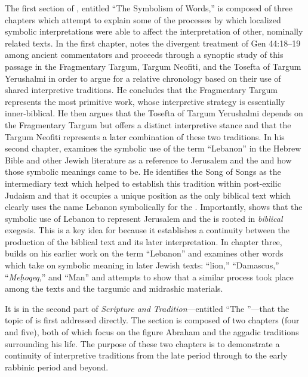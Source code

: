 The first section of , entitled ``The Symbolism of Words,'' is composed of three chapters which attempt to explain some of the processes by which localized symbolic interpretations were able to affect the interpretation of other, nominally related texts.
%
In the first chapter, \vermes notes the divergent treatment of Gen 44:18--19 among ancient commentators and proceeds through a synoptic study of this passage in the Fragmentary Targum, Targum Neofiti, and the Tosefta of Targum Yerushalmi in order to argue for a relative chronology based on their use of shared interpretive traditions. He concludes that the Fragmentary Targum represents the most primitive work, whose interpretive strategy is essentially inner-biblical. He then argues that the Tosefta of Targum Yerushalmi depends on the Fragmentary Targum but offers a distinct interpretive stance and that the Targum Neofiti represents a later combination of these two traditions.
%
In his second chapter, \vermes examines the symbolic use of the term ``Lebanon'' in the Hebrew Bible and other Jewish literature as a reference to Jerusalem and the \temple and how those symbolic meanings came to be. He identifies the Song of Songs as the intermediary text which helped to establish this tradition within post-exilic Judaism and that it occupies a unique position as the only biblical text which clearly uses the name Lebanon symbolically for the \temple. Importantly, \vermes shows that the symbolic use of Lebanon to represent Jerusalem and the \temple is rooted in \emph{biblical} exegesis. This is a key idea for \vermes because it establishes a continuity between the production of the biblical text and its later interpretation.
%
In chapter three, \vermes builds on his earlier work on the term ``Lebanon'' and examines other words which take on symbolic meaning in later Jewish texts: ``lion,'' ``Damascus,'' ``\emph{Meḥoqeq},'' and ``Man'' and attempts to show that a similar process took place among the \dss texts and the targumic and midrashic materials. 

It is in the second part of \emph{Scripture and Tradition}---entitled ``The \RwB''---that the topic of \RwB is first addressed directly. The section is composed of two chapters (four and five), both of which focus on the figure Abraham and the aggadic traditions surrounding his life. The purpose of these two chapters is to demonstrate a continuity of interpretive traditions from the late \secondtemple period through to the early rabbinic period and beyond. 

